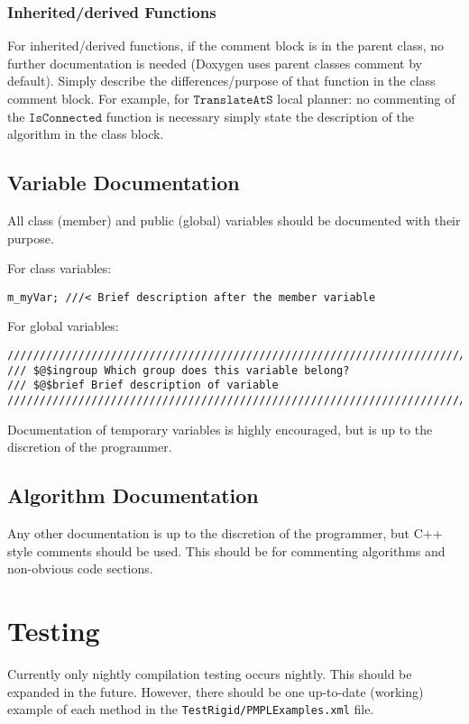 \documentclass[12pt]{article}
\begin{document}
\subsubsection{Inherited/derived Functions}
For inherited/derived functions, if the comment block is in the parent class,
no further documentation is needed (Doxygen uses parent classes comment by
default). Simply describe the differences/purpose of that function in the class
comment block. For example, for $\mathtt{TranslateAtS}$ local planner: no
commenting of the $\mathtt{IsConnected}$ function is necessary simply state the
description of the algorithm in the class block.

\subsection{Variable Documentation}

All class (member) and public (global) variables should be documented with their
purpose.

For class variables:
\begin{lstlisting}
m_myVar; ///< Brief description after the member variable
\end{lstlisting}

For global variables:
\begin{lstlisting}[mathescape]
///////////////////////////////////////////////////////////////////////////////
/// $@$ingroup Which group does this variable belong?
/// $@$brief Brief description of variable
///////////////////////////////////////////////////////////////////////////////
\end{lstlisting}

Documentation of temporary variables is highly encouraged, but is up to the
discretion of the programmer.

\subsection{Algorithm Documentation}

Any other documentation is up to the discretion of the programmer, but C++ style
comments should be used. This should be for commenting algorithms and
non-obvious code sections.


\section{Testing}
Currently only nightly compilation testing occurs nightly. This should be
expanded in the future. However, there should be one up-to-date (working)
example of each method in the \texttt{TestRigid/PMPLExamples.xml} file.
\end{document}
